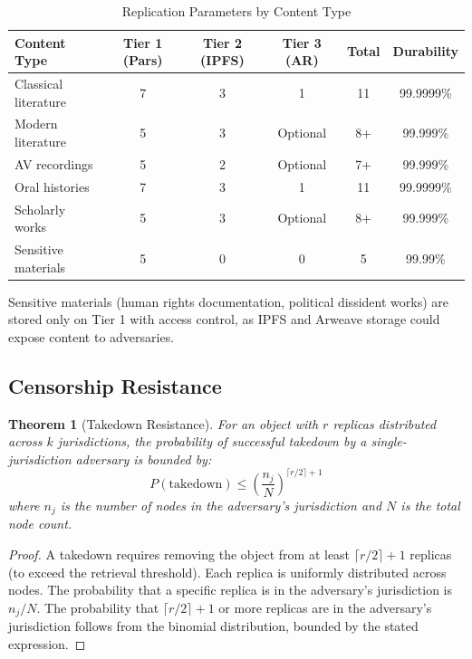\documentclass[11pt,a4paper]{article}
\newtheorem{theorem}{Theorem}
\begin{document}
\begin{table}[H]
\centering
\caption{Replication Parameters by Content Type}
\label{tab:replication}
\begin{tabular}{lccccc}
\toprule
\textbf{Content Type} & \textbf{Tier 1 (Pars)} & \textbf{Tier 2 (IPFS)} & \textbf{Tier 3 (AR)} & \textbf{Total} & \textbf{Durability} \\
\midrule
Classical literature & 7 & 3 & 1 & 11 & 99.9999\% \\
Modern literature & 5 & 3 & Optional & 8+ & 99.999\% \\
AV recordings & 5 & 2 & Optional & 7+ & 99.999\% \\
Oral histories & 7 & 3 & 1 & 11 & 99.9999\% \\
Scholarly works & 5 & 3 & Optional & 8+ & 99.999\% \\
Sensitive materials & 5 & 0 & 0 & 5 & 99.99\% \\
\bottomrule
\end{tabular}
\end{table}

Sensitive materials (human rights documentation, political dissident works) are stored only on Tier 1 with access control, as IPFS and Arweave storage could expose content to adversaries.

\subsection{Censorship Resistance}

\begin{theorem}[Takedown Resistance]
For an object with $r$ replicas distributed across $k$ jurisdictions, the probability of successful takedown by a single-jurisdiction adversary is bounded by:
\begin{equation}
    P(\text{takedown}) \leq \left(\frac{n_j}{N}\right)^{\lceil r/2 \rceil + 1}
\end{equation}
where $n_j$ is the number of nodes in the adversary's jurisdiction and $N$ is the total node count.
\end{theorem}

\begin{proof}
A takedown requires removing the object from at least $\lceil r/2 \rceil + 1$ replicas (to exceed the retrieval threshold). Each replica is uniformly distributed across nodes. The probability that a specific replica is in the adversary's jurisdiction is $n_j / N$. The probability that $\lceil r/2 \rceil + 1$ or more replicas are in the adversary's jurisdiction follows from the binomial distribution, bounded by the stated expression.
\end{proof}
\end{document}
